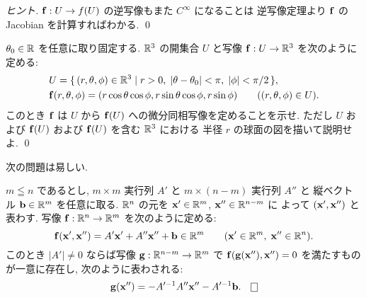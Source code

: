 \documentclass[12pt,twoside]{jarticle}
\begin{document}
\begin{proof}[ヒント]
 ${\mathbf f}:U\to f(U)$ の逆写像もまた $C^\infty$ になることは
 逆写像定理より ${\mathbf f}$ の Jacobian を計算すればわかる.
 \qed
\end{proof}

\begin{question}[3次元極座標]
 $\theta_0\in{\mathbb R}$ を任意に取り固定する.
 ${\mathbb R}^3$ の開集合 $U$ と写像 ${\mathbf f}:U\to{\mathbb R}^3$ を次のように定める:
 \begin{align*}
  &
  U = \{\,(r,\theta,\phi)\in{\mathbb R}^3
      \mid r > 0,\; |\theta-\theta_0|<\pi,\; |\phi|<\pi/2 \,\},
  \\ &
  {\mathbf f}(r,\theta,\phi) = (r\cos\theta\cos\phi, r\sin\theta\cos\phi, r\sin\phi)
  \qquad ((r,\theta,\phi)\in U).
 \end{align*}
 このとき ${\mathbf f}$ は $U$ から ${\mathbf f}(U)$ への微分同相写像を定めることを示せ.
 ただし $U$ および ${\mathbf f}(U)$ および ${\mathbf f}(U)$ を含む ${\mathbb R}^3$ における
 半径 $r$ の球面の図を描いて説明せよ.
 \qed
\end{question}

次の問題は易しい.

\begin{question}[一次函数の陰函数定理]
 $m\leqq n$ であるとし, 
 $m\times m$ 実行列 $A'$ と $m\times(n-m)$ 実行列 $A''$ と
 縦ベクトル ${\mathbf b}\in{\mathbb R}^m$ を任意に取る.
 ${\mathbb R}^n$ の元を ${\mathbf x}'\in{\mathbb R}^m$, ${\mathbf x}''\in{\mathbb R}^{n-m}$ に
 よって $({\mathbf x}',{\mathbf x}'')$ と表わす.
 写像 ${\mathbf f}:{\mathbb R}^n\to{\mathbb R}^m$ を次のように定める:
 \begin{equation*}
  {\mathbf f}({\mathbf x}',{\mathbf x}'') = A'{\mathbf x}' + A''{\mathbf x}'' + {\mathbf b} \in {\mathbb R}^m
   \qquad ({\mathbf x}'\in{\mathbb R}^m,\; {\mathbf x}''\in{\mathbb R}^n).
 \end{equation*}
 このとき $|A'|\ne 0$ ならば写像 ${\mathbf g}:{\mathbb R}^{n-m}\to{\mathbb R}^m$ 
 で ${\mathbf f}({\mathbf g}({\mathbf x}''),{\mathbf x}'') = 0$ を満たすものが一意に存在し, 
 次のように表わされる:
 \begin{equation*}
  \g(\x'') = - A'^{-1}A''\x'' - A'^{-1}\b.
  \qed
 \end{equation*}
\end{question}
\end{document}
